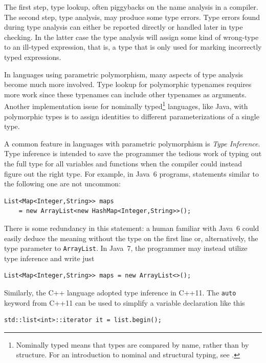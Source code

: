 \documentclass[10pt, twoside, openright]{book}
\begin{document}
The first step, type lookup, often piggybacks on the name analysis in a compiler.
The second step, type analysis, may produce some type errors. Type errors found during type
analysis can either be reported directly or handled later in type checking. In the latter case
the type analysis will assign some kind of wrong-type to an ill-typed expression, that is, a type
that is only used for marking incorrectly typed expressions.

In languages using parametric polymorphism, many aspects of type analysis become much more involved.
Type lookup for polymorphic typenames requires more work since these typenames
can include other typenames as arguments.
Another implementation issue for nominally typed\footnote{%
Nominally typed means that types are compared by name, rather
than by structure. For an introduction to nominal and structural typing,
see \textcite[p.~251-254]{DBLP:books/daglib/0005958}.}
languages, like Java, with polymorphic types is to
assign identities to different
parameterizations of a single type.

A common feature in languages with parametric polymorphism is \emph{Type Inference}. Type inference is
intended to save the programmer the tedious work of typing out the full type for
all variables and functions when the compiler could instead figure out the
right type. For example, in Java~6 programs, statements
similar to the following one are not uncommon:

\begin{lstlisting}
List<Map<Integer,String>> maps
    = new ArrayList<new HashMap<Integer,String>>();
\end{lstlisting}

\noindent
There is some redundancy in this statement: a human familiar with Java~6 could easily deduce the
meaning without the type on the first line or, alternatively, the type parameter to \verb'ArrayList'.
In Java~7, the programmer may instead utilize type inference and write just

\begin{lstlisting}
List<Map<Integer,String>> maps = new ArrayList<>();
\end{lstlisting}

\noindent
Similarly, the C++ language adopted type inference in C++11. The \verb'auto' keyword from
C++11 can be used to simplify a variable declaration like this

\begin{lstlisting}
std::list<int>::iterator it = list.begin();
\end{lstlisting}
\end{document}
